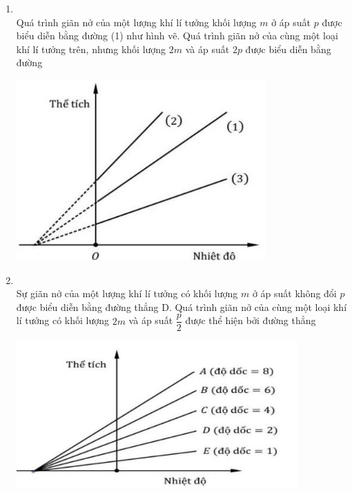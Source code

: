 \begin{enumerate}[label=\bfseries Câu \arabic*:, leftmargin=1.7cm]
\item {}\\
Quá trình giãn nở của một lượng khí lí tưởng khối lượng $m$ ở áp suất $p$ được biểu diễn bằng đường (1) như hình vẽ. Quá trình giãn nở của cùng một loại khí lí tưởng trên, nhưng khối lượng $2m$ và áp suất $2p$ được biểu diễn bằng đường
\begin{center}
	\includegraphics[width=0.35\linewidth]{../figs/VN12-Y24-PH-SYL-014P-5}
\end{center}

\item {}\\
Sự giãn nở của một lượng khí lí tưởng có khối lượng $m$ ở áp suất không đổi $p$ được biểu diễn bằng đường thẳng D. Quá trình giãn nở của cùng một loại khí lí tưởng có khối lượng $2m$ và áp suất $\dfrac{p}{2}$ được thể hiện bởi đường thẳng
\begin{center}
	\includegraphics[width=0.45\linewidth]{../figs/VN12-Y24-PH-SYL-014P-6}
\end{center} 


\end{enumerate}
